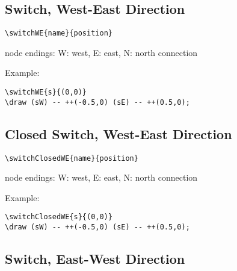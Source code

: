 \documentclass[parskip=full]{scrartcl}
\begin{document}
\subsection{Switch, West-East Direction}

\begin{verbatim}
\switchWE{name}{position}
\end{verbatim}
node endings: W: west, E: east, N: north connection

Example:\\
\begin{minipage}{0.8\textwidth}
\begin{verbatim}
\switchWE{s}{(0,0)}
\draw (sW) -- ++(-0.5,0) (sE) -- ++(0.5,0);
\end{verbatim}
\end{minipage}
\begin{minipage}{0.19\textwidth}
\end{minipage}

\subsection{Closed Switch, West-East Direction}

\begin{verbatim}
\switchClosedWE{name}{position}
\end{verbatim}
node endings: W: west, E: east, N: north connection

Example:\\
\begin{minipage}{0.8\textwidth}
\begin{verbatim}
\switchClosedWE{s}{(0,0)}
\draw (sW) -- ++(-0.5,0) (sE) -- ++(0.5,0);
\end{verbatim}
\end{minipage}
\begin{minipage}{0.19\textwidth}
\end{minipage}

\subsection{Switch, East-West Direction}
\end{document}
